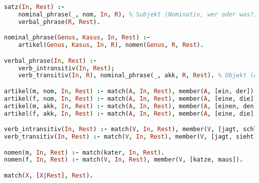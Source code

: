  $ $
\begin{lstlisting}[language=Prolog]
satz(In, Rest) :- 
	nominal_phrase(_, nom, In, R), % Subjekt (Nominativ, wer oder was?) 
	verbal_phrase(R, Rest).

nominal_phrase(Genus, Kasus, In, Rest) :- 
	artikel(Genus, Kasus, In, R), nomen(Genus, R, Rest).

verbal_phrase(In, Rest) :- 
	verb_intransitiv(In, Rest);
	verb_transitiv(In, R), nominal_phrase(_, akk, R, Rest). % Objekt (Akkusativ, wen oder was?)

artikel(m, nom, In, Rest) :- match(A, In, Rest), member(A, [ein, der]).
artikel(f, nom, In, Rest) :- match(A, In, Rest), member(A, [eine, die]).
artikel(m, akk, In, Rest) :- match(A, In, Rest), member(A, [einen, den]).
artikel(f, akk, In, Rest) :- match(A, In, Rest), member(A, [eine, die]).

verb_intransitiv(In, Rest) :- match(V, In, Rest), member(V, [jagt, schläft, rennt]).
verb_transitiv(In, Rest) :- match(V, In, Rest), member(V, [jagt, sieht]).

nomen(m, In, Rest) :- match(kater, In, Rest).
nomen(f, In, Rest) :- match(V, In, Rest), member(V, [katze, maus]).

match(X, [X|Rest], Rest).
\end{lstlisting}





